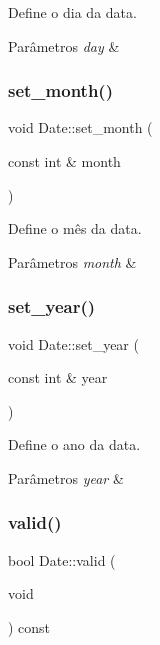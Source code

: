 Define o dia da data. 


\begin{DoxyParams}{Parâmetros}
{\em day} & \\
\hline
\end{DoxyParams}
\mbox{\label{classDate_ab264919c7dfd3ea017fb5dc08af64796}} 
\subsubsection{\texorpdfstring{set\+\_\+month()}{set\_month()}}
{\footnotesize\ttfamily void Date\+::set\+\_\+month (\begin{DoxyParamCaption}\item[{const int \&}]{month }\end{DoxyParamCaption})}



Define o mês da data. 


\begin{DoxyParams}{Parâmetros}
{\em month} & \\
\hline
\end{DoxyParams}
\mbox{\label{classDate_a275c629c60d6f8d29440b1a89273b091}} 
\subsubsection{\texorpdfstring{set\+\_\+year()}{set\_year()}}
{\footnotesize\ttfamily void Date\+::set\+\_\+year (\begin{DoxyParamCaption}\item[{const int \&}]{year }\end{DoxyParamCaption})}



Define o ano da data. 


\begin{DoxyParams}{Parâmetros}
{\em year} & \\
\hline
\end{DoxyParams}
\mbox{\label{classDate_a03bd622b075b79a9c4e3a80552f8428e}} 
\subsubsection{\texorpdfstring{valid()}{valid()}}
{\footnotesize\ttfamily bool Date\+::valid (\begin{DoxyParamCaption}\item[{void}]{ }\end{DoxyParamCaption}) const}



